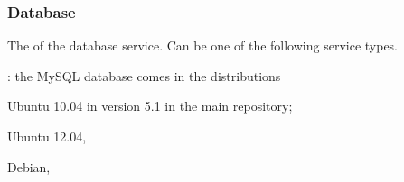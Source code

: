 \subsubsection*{Database}


The  of the database service. Can be one of the following 
service types.
\begin{asparaitem}
%
\item[\qcode{mysql}:] 
the MySQL database comes in the distributions 
\begin{compactitem}
\item[\TheDistribution{ubuntu}] Ubuntu 10.04 in version 5.1 in the main repository;
\item[\TheDistribution{ubuntu}] Ubuntu 12.04,
\item[\TheDistribution{debian}] Debian,
\end{compactitem}
%
\end{asparaitem}

